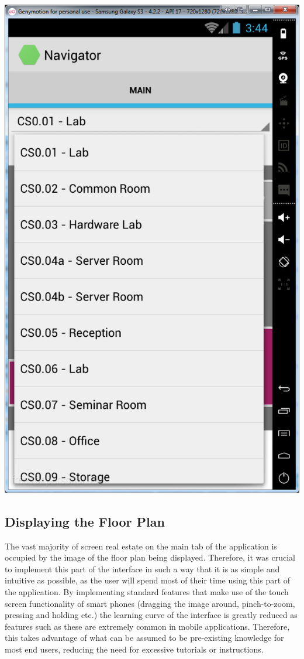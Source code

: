\documentclass[12pt,a4paper]{report}
\begin{document}
            \begin{center}
\includegraphics[scale=0.5]{images/search_open.png}
\label{fig:androidSpinner}
\end{center}
        \subsection{Displaying the Floor Plan}
            The vast majority of screen real estate on the main tab of the application is occupied by the image of the floor plan being displayed. Therefore, it was crucial to 
            implement this part of the interface in such a way that it is as simple and intuitive as possible, as the user will spend most of their time using this part of
            the application. By implementing standard features that make use of the touch screen functionality of smart phones (dragging the image around, pinch-to-zoom,
            pressing and holding etc.)
            the learning curve of the interface is greatly reduced as features such as these are extremely common in mobile applications. Therefore, this takes advantage of 
            what can be assumed to be pre-existing knowledge for most end users, reducing the need for excessive tutorials or instructions.
            
\end{document}
